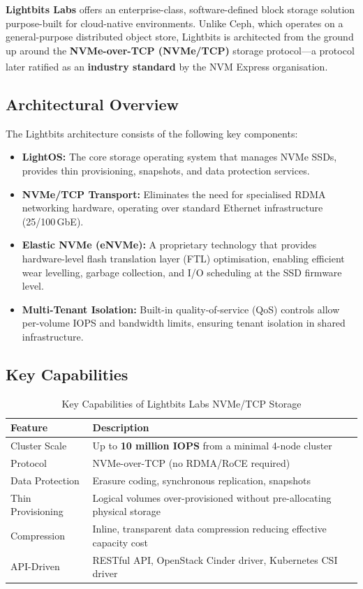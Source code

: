 \documentclass[12pt,a4paper,oneside]{report}
\begin{document}
\textbf{Lightbits Labs} offers an enterprise-class, software-defined block storage solution purpose-built for cloud-native environments. Unlike Ceph, which operates on a general-purpose distributed object store, Lightbits is architected from the ground up around the \textbf{NVMe-over-TCP (NVMe/TCP)} storage protocol—a protocol later ratified as an \textbf{industry standard} by the NVM Express\textsuperscript{\textregistered} organisation.

\subsection{Architectural Overview}

The Lightbits architecture consists of the following key components:

\begin{itemize}
    \item \textbf{LightOS:} The core storage operating system that manages NVMe SSDs, provides thin provisioning, snapshots, and data protection services.
    \item \textbf{NVMe/TCP Transport:} Eliminates the need for specialised RDMA networking hardware, operating over standard Ethernet infrastructure (25/100\,GbE).
    \item \textbf{Elastic NVMe (eNVMe\texttrademark):} A proprietary technology that provides hardware-level flash translation layer (FTL) optimisation, enabling efficient wear levelling, garbage collection, and I/O scheduling at the SSD firmware level.
    \item \textbf{Multi-Tenant Isolation:} Built-in quality-of-service (QoS) controls allow per-volume IOPS and bandwidth limits, ensuring tenant isolation in shared infrastructure.
\end{itemize}

\subsection{Key Capabilities}

\begin{table}[h]
\centering
\begin{tabular}{@{} l p{10cm} @{}}
\toprule
\textbf{Feature} & \textbf{Description} \\
\midrule
Cluster Scale & Up to \textbf{10 million IOPS} from a minimal 4-node cluster \\
Protocol & NVMe-over-TCP (no RDMA/RoCE required) \\
Data Protection & Erasure coding, synchronous replication, snapshots \\
Thin Provisioning & Logical volumes over-provisioned without pre-allocating physical storage \\
Compression & Inline, transparent data compression reducing effective capacity cost \\
API-Driven & RESTful API, OpenStack Cinder driver, Kubernetes CSI driver \\
\bottomrule
\end{tabular}
\caption{Key Capabilities of Lightbits Labs NVMe/TCP Storage}
\label{tab:lightbits-capabilities}
\end{table}
\end{document}
